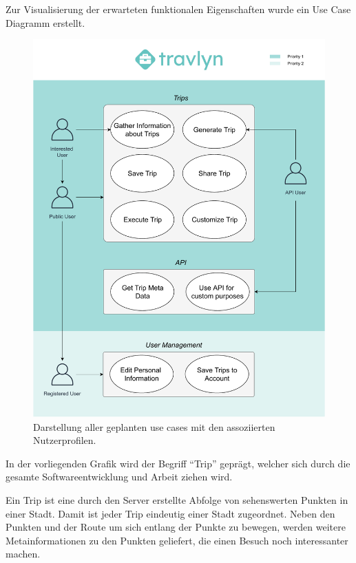 Zur Visualisierung der erwarteten funktionalen Eigenschaften wurde ein Use Case Diagramm erstellt.
\begin{figure}[H]
	\centering
	\includegraphics[width=1\textwidth]{images/UCD.pdf}
	\caption{Darstellung aller geplanten use cases mit den assoziierten Nutzerprofilen.}
	\label{fig:UCD}
\end{figure}

\newpage

In der vorliegenden Grafik wird der Begriff \enquote{Trip} geprägt, welcher sich durch die gesamte Softwareentwicklung und Arbeit ziehen wird.

\begin{defStrich}[Trip]
	Ein Trip ist eine durch den Server erstellte Abfolge von sehenswerten Punkten in einer Stadt. Damit ist jeder Trip eindeutig einer Stadt zugeordnet. Neben den Punkten und der Route um sich entlang der Punkte zu bewegen, werden weitere Metainformationen zu den Punkten geliefert, die einen Besuch noch interessanter machen.
\end{defStrich} 


